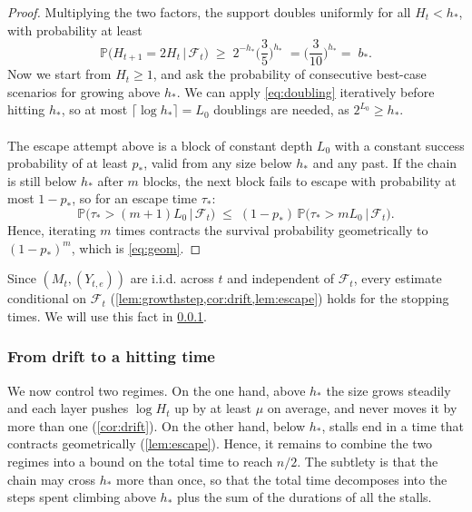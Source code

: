 \documentclass[
    aps,
    superscriptaddress,
    onecolumn,
    10pt,
    prx,
    nofootinbib
]{revtex4-2}
\theoremstyle{namedstatement}
\theoremstyle{plain}
\begin{document}
\begin{proof}
Multiplying the two factors, the support doubles uniformly for all $H_t<h_\ast$, with probability at least
\begin{equation}\label{eq:doubling}
  \mathbb P\big(H_{t+1}=2H_t\,\big|\,\mathcal F_t\big)
  \;\ge\;2^{-h_\ast}\Big(\frac35\Big)^{h_\ast}\;=
  \Big(\frac{3}{10}\Big)^{h_\ast}=
  \;b_\ast.
\end{equation}
Now we start from $H_t\ge1$, and ask the probability of consecutive best-case scenarios for growing above $h_{\ast}$. We can apply \cref{eq:doubling} iteratively before hitting $h_{\ast}$, so at most $\lceil\log h_\ast\rceil=L_0$ doublings are needed, as $2^{L_0} \geq h_*$.
\\
\\
The escape attempt above is a block of constant depth $L_0$ with a constant success probability of at least $p_\ast$, valid from any size below $h_\ast$ and any past. If the chain is still below $h_\ast$ after $m$ blocks, the next block fails to escape with probability at most
$1-p_\ast$, so for an escape time $\tau_\ast$:
\begin{equation}
  \mathbb P\big(\tau_\ast>(m+1)L_0\,\big|\,\mathcal F_t\big)
  \;\le\;(1-p_\ast)\,\mathbb P\big(\tau_\ast>mL_0\,\big|\,\mathcal F_t\big).
\end{equation}
Hence, iterating $m$ times contracts the survival probability geometrically to
$(1-p_\ast)^m$, which is \cref{eq:geom}.
\end{proof}

Since $(M_t, (Y_{t,e}))$ are i.i.d. across $t$ and independent of $\mathcal{F}_t$, every estimate conditional on $\mathcal{F}_t$ (\cref{lem:growthstep,cor:drift,lem:escape}) holds for the stopping times. We will use this fact in \cref{sec:growth-hitting}.

\subsubsection{From drift to a hitting time}\label{sec:growth-hitting}

We now control two regimes. On the one hand, above $h_\ast$ the size grows steadily and each layer pushes $\log H_t$ up by at least $\mu$ on average, and never moves it by more than one (\cref{cor:drift}). On the other hand, below $h_\ast$, stalls end in a time that contracts geometrically (\cref{lem:escape}). Hence, it remains to combine the two regimes into a bound on the total time to reach $n/2$. The subtlety is that the chain may cross $h_{*}$ more than once, so that the total time decomposes into the steps spent climbing above $h_\ast$ plus the sum of the durations of all the stalls.
\end{document}
